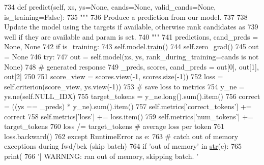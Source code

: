 \begin{DoxyCode}
734     \textcolor{keyword}{def }predict(self, xs, ys=None, cands=None, valid\_cands=None, is\_training=False):
735         \textcolor{stringliteral}{"""}
736 \textcolor{stringliteral}{        Produce a prediction from our model.}
737 \textcolor{stringliteral}{}
738 \textcolor{stringliteral}{        Update the model using the targets if available, otherwise rank candidates as}
739 \textcolor{stringliteral}{        well if they are available and param is set.}
740 \textcolor{stringliteral}{        """}
741         predictions, cand\_preds = \textcolor{keywordtype}{None}, \textcolor{keywordtype}{None}
742         \textcolor{keywordflow}{if} is\_training:
743             self.model.\hyperlink{namespaceprojects_1_1mastering__the__dungeon_1_1mturk_1_1tasks_1_1MTD_1_1run_a36a5f4f6f9df0611a6818610518d2cf0}{train}()
744             self.zero\_grad()
745             out = \textcolor{keywordtype}{None}
746             \textcolor{keywordflow}{try}:
747                 out = self.model(xs, ys, rank\_during\_training=cands \textcolor{keywordflow}{is} \textcolor{keywordflow}{not} \textcolor{keywordtype}{None})
748                 \textcolor{comment}{# generated response}
749                 \_preds, scores, cand\_preds = out[0], out[1], out[2]
750 
751                 score\_view = scores.view(-1, scores.size(-1))
752                 loss = self.criterion(score\_view, ys.view(-1))
753                 \textcolor{comment}{# save loss to metrics}
754                 y\_ne = ys.ne(self.NULL\_IDX)
755                 target\_tokens = y\_ne.long().sum().item()
756                 correct = ((ys == \_preds) * y\_ne).sum().item()
757                 self.metrics[\textcolor{stringliteral}{'correct\_tokens'}] += correct
758                 self.metrics[\textcolor{stringliteral}{'loss'}] += loss.item()
759                 self.metrics[\textcolor{stringliteral}{'num\_tokens'}] += target\_tokens
760                 loss /= target\_tokens  \textcolor{comment}{# average loss per token}
761                 loss.backward()
762             \textcolor{keywordflow}{except} RuntimeError \textcolor{keyword}{as} e:
763                 \textcolor{comment}{# catch out of memory exceptions during fwd/bck (skip batch)}
764                 \textcolor{keywordflow}{if} \textcolor{stringliteral}{'out of memory'} \textcolor{keywordflow}{in} \hyperlink{namespacegenerate__task__READMEs_a5b88452ffb87b78c8c85ececebafc09f}{str}(e):
765                     print(
766                         \textcolor{stringliteral}{'| WARNING: ran out of memory, skipping batch. '}

\end{DoxyCode}
